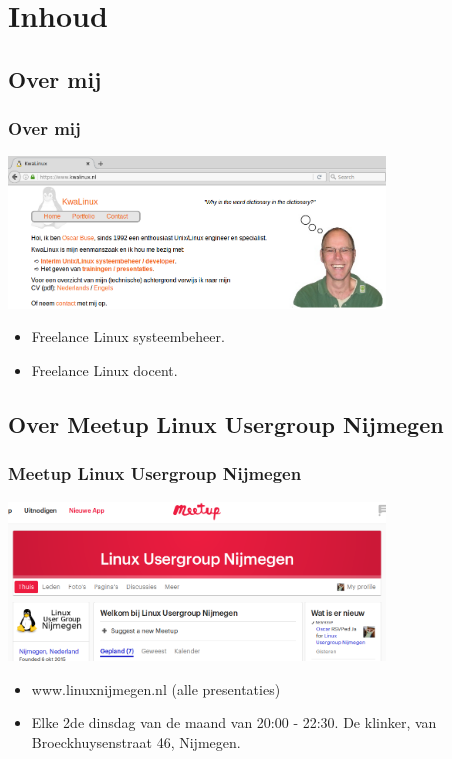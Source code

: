 \section{Inhoud}
\subsection{Over mij}
\begin{styleframe}
    \frametitle{Over mij}
\includegraphics[width=10cm]{kwalinux.png}
\begin{itemize}
	\item Freelance Linux systeembeheer.
	\item Freelance Linux docent.
\end{itemize}
\end{styleframe}

\subsection{Over Meetup Linux Usergroup Nijmegen}
\begin{styleframe}
    \frametitle{Meetup Linux Usergroup Nijmegen}
\includegraphics[width=10cm]{linuxnijmegen_meetup.png}
\begin{itemize}
	\item www.linuxnijmegen.nl (alle presentaties)
	\item Elke 2de dinsdag van de maand van 20:00 - 22:30. De klinker, van Broeckhuysenstraat 46, Nijmegen. 
\end{itemize}
\end{styleframe}

